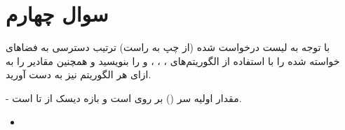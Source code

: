 \section{سوال چهارم}


با توجه به لیست درخواست شده (از چپ به راست) ترتیب دسترسی به فضاهای خواسته شده را با استفاده از الگوریتم‌های ، ، ،  و  را بنویسید و همچنین مقادیر  را به ازای هر الگوریتم نیز به دست آورید.

- مقدار اولیه سر () بر روی  است و بازه دیسک از  تا  است.


\begin{latin}
	\begin{itemize}
		\item {}
	\end{itemize}
\end{latin}

